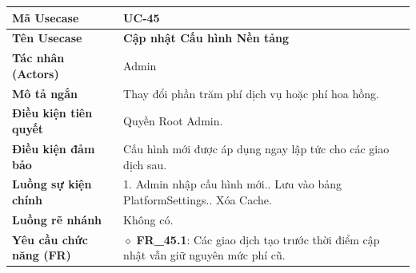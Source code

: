 \begin{table}[H]
\renewcommand{\arraystretch}{1.3}
\centering
\begin{tabularx}{\textwidth}{|p{4.5cm}|X|}
\hline
\cellcolor{gray!15}\bfseries Mã Usecase & \textbf{UC-45} \\ \hline
\cellcolor{gray!15}\bfseries Tên Usecase & \textbf{Cập nhật Cấu hình Nền tảng} \\ \hline
\cellcolor{gray!15}\bfseries Tác nhân (Actors) & Admin \\ \hline
\cellcolor{gray!15}\bfseries Mô tả ngắn & Thay đổi phần trăm phí dịch vụ hoặc phí hoa hồng. \\ \hline
\cellcolor{gray!15}\bfseries Điều kiện tiên quyết & Quyền Root Admin. \\ \hline
\cellcolor{gray!15}\bfseries Điều kiện đảm bảo & Cấu hình mới được áp dụng ngay lập tức cho các giao dịch sau. \\ \hline
\cellcolor{gray!15}\bfseries Luồng sự kiện chính & 1. Admin nhập cấu hình mới.\newline 2. Lưu vào bảng PlatformSettings.\newline 3. Xóa Cache. \\ \hline
\cellcolor{gray!15}\bfseries Luồng rẽ nhánh & Không có. \\ \hline
\cellcolor{gray!15}\bfseries Yêu cầu chức năng (FR) & $\diamond$ \textbf{FR\_45.1}: Các giao dịch tạo trước thời điểm cập nhật vẫn giữ nguyên mức phí cũ. \\ \hline
\end{tabularx}
\end{table}
